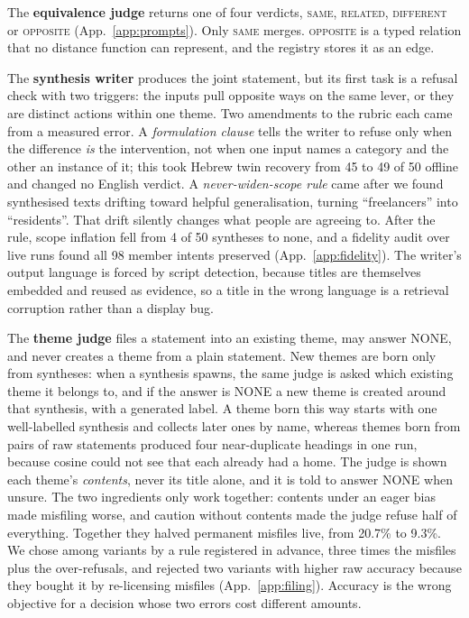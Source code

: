 \documentclass{article}
\begin{document}
The \textbf{equivalence judge} returns one of four verdicts, \textsc{same}, \textsc{related}, \textsc{different} or \textsc{opposite} (App.~\ref{app:prompts}). Only \textsc{same} merges. \textsc{opposite} is a typed relation that no distance function can represent, and the registry stores it as an edge.

The \textbf{synthesis writer} produces the joint statement, but its first task is a refusal check with two triggers: the inputs pull opposite ways on the same lever, or they are distinct actions within one theme. Two amendments to the rubric each came from a measured error. A \emph{formulation clause} tells the writer to refuse only when the difference \emph{is} the intervention, not when one input names a category and the other an instance of it; this took Hebrew twin recovery from 45 to 49 of 50 offline and changed no English verdict. A \emph{never-widen-scope rule} came after we found synthesised texts drifting toward helpful generalisation, turning ``freelancers'' into ``residents''. That drift silently changes what people are agreeing to. After the rule, scope inflation fell from 4 of 50 syntheses to none, and a fidelity audit over live runs found all 98 member intents preserved (App.~\ref{app:fidelity}). The writer's output language is forced by script detection, because titles are themselves embedded and reused as evidence, so a title in the wrong language is a retrieval corruption rather than a display bug.

The \textbf{theme judge} files a statement into an existing theme, may answer NONE, and never creates a theme from a plain statement. New themes are born only from syntheses: when a synthesis spawns, the same judge is asked which existing theme it belongs to, and if the answer is NONE a new theme is created around that synthesis, with a generated label. A theme born this way starts with one well-labelled synthesis and collects later ones by name, whereas themes born from pairs of raw statements produced four near-duplicate headings in one run, because cosine could not see that each already had a home. The judge is shown each theme's \emph{contents}, never its title alone, and it is told to answer NONE when unsure. The two ingredients only work together: contents under an eager bias made misfiling worse, and caution without contents made the judge refuse half of everything. Together they halved permanent misfiles live, from 20.7\% to 9.3\%. We chose among variants by a rule registered in advance, three times the misfiles plus the over-refusals, and rejected two variants with higher raw accuracy because they bought it by re-licensing misfiles (App.~\ref{app:filing}). Accuracy is the wrong objective for a decision whose two errors cost different amounts.
\end{document}
